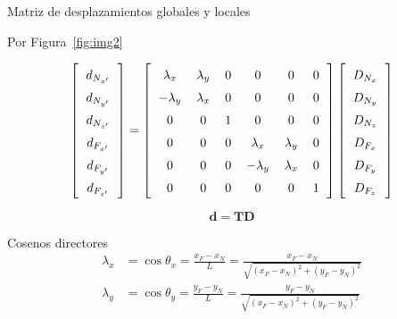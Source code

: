 \documentclass{beamer}
\begin{document}
\begin{frame}{Matriz de desplazamientos globales y locales}


  Por Figura~\ref{fig:img2}

        \[
                \setlength{\arraycolsep}{6pt}
        \renewcommand{\arraystretch}{1.5}
        \left[
        \begin{array}{c}
        d_{N_{x'}} \\
        d_{N_{y'}} \\
        d_{N_{z'}} \\
        d_{F_{x'}} \\
        d_{F_{y'}} \\
        d_{F_{z'}}
        \end{array}
        \right]
        =
        \left[
        \begin{array}{cccccc}
        \lambda_x & \lambda_y & 0 & 0 & 0 & 0 \\
        -\lambda_y & \lambda_x & 0 & 0 & 0 & 0 \\
        0 & 0 & 1 & 0 & 0 & 0 \\
        0 & 0 & 0 & \lambda_x & \lambda_y & 0 \\
        0 & 0 & 0 & -\lambda_y & \lambda_x & 0 \\
        0 & 0 & 0 & 0 & 0 & 1
        \end{array}
        \right]
        \left[
        \begin{array}{c}
        D_{N_{x}} \\
        D_{N_{y}} \\
        D_{N_{z}} \\
        D_{F_{x}} \\
        D_{F_{y}} \\
        D_{F_{z}}
        \end{array}
        \right]
        \]


        \[
        \mathbf{d} = \mathbf{T} \mathbf{D}
        \]

\end{frame}

\begin{frame}{Cosenos directores}
\begin{align*}
    \lambda_x &= \cos\theta_x = \frac{x_F - x_N}{L} = \frac{x_F - x_N}{\sqrt{(x_F - x_N)^2 + (y_F - y_N)^2}} \\
    \lambda_y &= \cos\theta_y = \frac{y_F - y_N}{L} = \frac{y_F - y_N}{\sqrt{(x_F - x_N)^2 + (y_F - y_N)^2}}
    \end{align*}
\end{frame}
\end{document}
